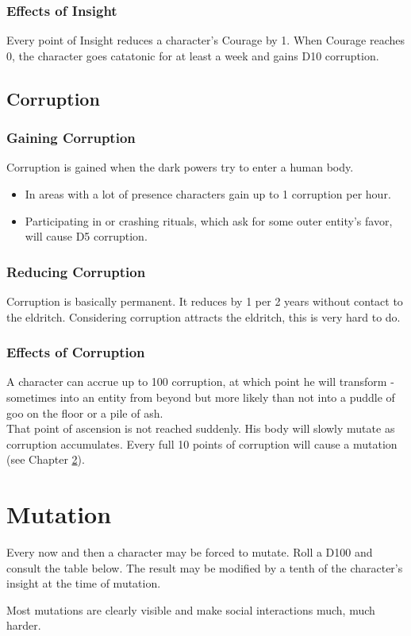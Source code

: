 \documentclass[12pt,a4paper,openany]{book}
\begin{document}
	\subsection{Effects of Insight}
	Every point of Insight reduces a character's Courage by 1. When Courage reaches 0, the character goes catatonic for at least a week and gains D10 corruption.
	
	\section{Corruption}
	\subsection{Gaining Corruption}
	Corruption is gained when the dark powers try to enter a human body. 
	\vspace{-8mm}
	\begin{itemize}
		\setlength\itemsep{-8mm}
		\item In areas with a lot of presence characters gain up to 1 corruption per hour.
		\item Participating in or crashing rituals, which ask for some outer entity's favor, will cause D5 corruption.
	\end{itemize}
	\subsection{Reducing Corruption}
	Corruption is basically permanent. It reduces by 1 per 2 years without contact to the eldritch. Considering corruption attracts the eldritch, this is very hard to do.
	\subsection{Effects of Corruption}
	A character can accrue up to 100 corruption, at which point he will transform - sometimes into an entity from beyond but more likely than not into a puddle of goo on the floor or a pile of ash.\\
	That point of ascension is not reached suddenly. His body will slowly mutate as corruption accumulates. Every full 10 points of corruption will cause a mutation (see Chapter \ref{ch:mutation}).
	
	\chapter{Mutation}
	\label{ch:mutation}
	Every now and then a character may be forced to mutate. Roll a D100 and consult the table below. The result may be modified by a tenth of the character's insight at the time of mutation.
	\par
	Most mutations are clearly visible and make social interactions much, much harder.
\end{document}
